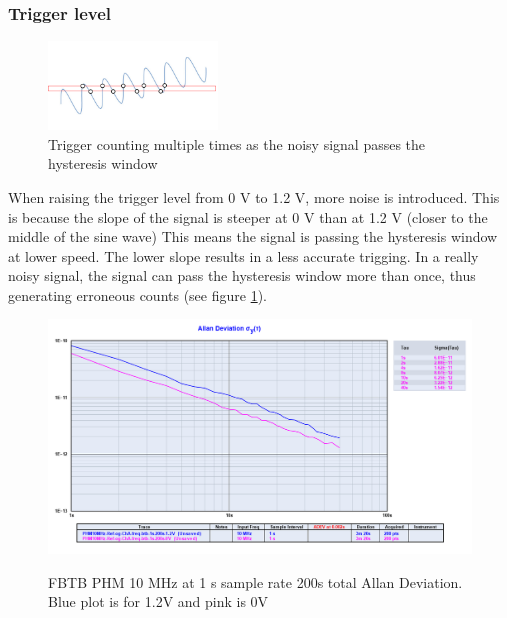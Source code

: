 \documentclass[11pt,english,a4paper]{article}
\begin{document}
\newpage
\subsubsection{Trigger level}
\begin{figure}
  \centering
  \includegraphics[width=0.40\textwidth]{hysteresis.pdf}
  \caption{Trigger counting multiple times as the noisy signal passes the hysteresis window}
    \label{fig:hysteresis}
\end{figure}
When raising the trigger level from 0 V to 1.2 V, more noise is introduced. This is because the slope of the signal is steeper at 0 V than at 1.2 V (closer to the middle of the sine wave) This means the signal is passing the hysteresis window at lower speed. The lower slope results in a less accurate trigging. In a really noisy signal, the signal can pass the hysteresis window more than once, thus generating erroneous counts (see figure \ref{fig:hysteresis}). 

\begin{figure}[!htb]
  \centering
    \includegraphics[width=1\textwidth]{PHM10MHz-Ref-og-ChA-freq-btb-1s-200s-allan.png}
    \label{fig:PHM_10MHz_0V_1.2V_allan_dev}
    \caption{FBTB PHM 10 MHz at 1 s sample rate 200s total Allan Deviation. Blue plot is for 1.2V and pink is 0V}
\end{figure}
\end{document}

